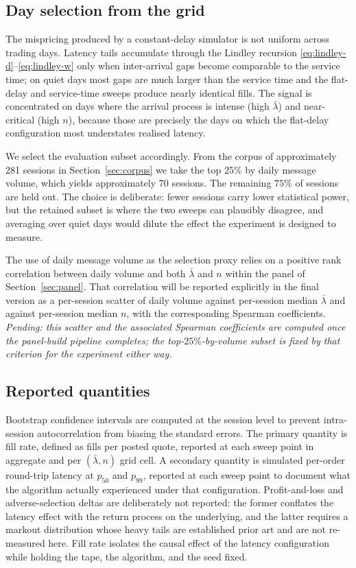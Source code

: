 \documentclass[11pt]{article}
\begin{document}
\subsection{Day selection from the grid}
\label{sec:experiment-days}

The mispricing produced by a constant-delay simulator is not uniform across trading days. Latency tails accumulate through the Lindley recursion \eqref{eq:lindley-d}--\eqref{eq:lindley-w} only when inter-arrival gaps become comparable to the service time; on quiet days most gaps are much larger than the service time and the flat-delay and service-time sweeps produce nearly identical fills. The signal is concentrated on days where the arrival process is intense (high $\bar\lambda$) and near-critical (high $n$), because those are precisely the days on which the flat-delay configuration most understates realised latency.

We select the evaluation subset accordingly. From the corpus of approximately 281 sessions in Section~\ref{sec:corpus} we take the top $25\%$ by daily message volume, which yields approximately 70 sessions. The remaining $75\%$ of sessions are held out. The choice is deliberate: fewer sessions carry lower statistical power, but the retained subset is where the two sweeps can plausibly disagree, and averaging over quiet days would dilute the effect the experiment is designed to measure.

The use of daily message volume as the selection proxy relies on a positive rank correlation between daily volume and both $\bar\lambda$ and $n$ within the panel of Section~\ref{sec:panel}. That correlation will be reported explicitly in the final version as a per-session scatter of daily volume against per-session median $\bar\lambda$ and against per-session median $n$, with the corresponding Spearman coefficients. \emph{Pending: this scatter and the associated Spearman coefficients are computed once the panel-build pipeline completes; the top-$25\%$-by-volume subset is fixed by that criterion for the experiment either way.}

\subsection{Reported quantities}
\label{sec:experiment-quantities}

Bootstrap confidence intervals are computed at the session level to prevent intra-session autocorrelation from biasing the standard errors. The primary quantity is fill rate, defined as fills per posted quote, reported at each sweep point in aggregate and per $(\bar\lambda, n)$ grid cell. A secondary quantity is simulated per-order round-trip latency at $p_{50}$ and $p_{99}$, reported at each sweep point to document what the algorithm actually experienced under that configuration. Profit-and-loss and adverse-selection deltas are deliberately not reported: the former conflates the latency effect with the return process on the underlying, and the latter requires a markout distribution whose heavy tails are established prior art \citep{carteajaimungalricci2014} and are not re-measured here. Fill rate isolates the causal effect of the latency configuration while holding the tape, the algorithm, and the seed fixed.
\end{document}
